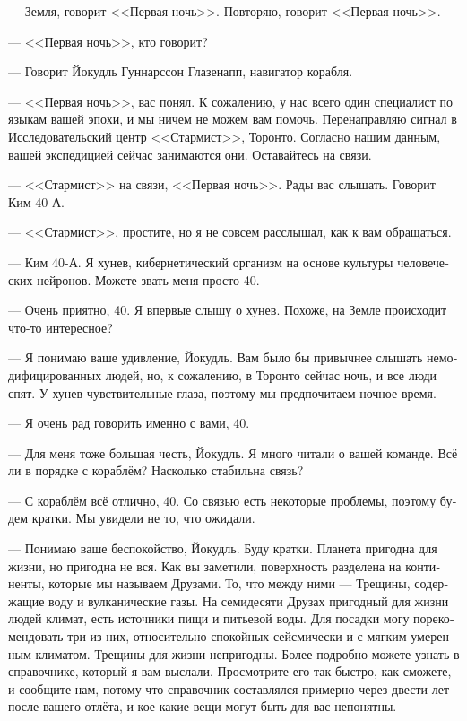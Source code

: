 \documentclass[a4paper,10pt,fleqn]{book}\usepackage{polyglossia}\setdefaultlanguage[babelshorthands=true]{russian}\setotherlanguage{english}\defaultfontfeatures{Ligatures=TeX,Mapping=tex-text}\usepackage{xcolor}\newcommand{\ml}[3]{#2}
\newcommand{\asterism}{\vspace{1em}{\centering\Large\bfseries$\ast~\ast~\ast$\par}\vspace{1em}}
\begin{document}
\asterism

--- Земля, говорит <<Первая ночь>>.
Повторяю, говорит <<Первая ночь>>.

--- <<Первая ночь>>, кто говорит?

--- Говорит Йокудль Гуннарссон Глазенапп, навигатор корабля.

--- <<Первая ночь>>, вас понял.
К сожалению, у нас всего один специалист по языкам вашей эпохи, и мы ничем не можем вам помочь.
Перенаправляю сигнал в Исследовательский центр <<Стармист>>, Торонто.
Согласно нашим данным, вашей экспедицией сейчас занимаются они.
Оставайтесь на связи.

--- <<Стармист>> на связи, <<Первая ночь>>.
Рады вас слышать.
Говорит Ким 40-А.

--- <<Стармист>>, простите, но я не совсем расслышал, как к вам обращаться.

--- Ким 40-А.
Я хунев, кибернетический организм на основе культуры человеческих нейронов.
Можете звать меня просто 40.

--- Очень приятно, 40.
Я впервые слышу о хунев.
Похоже, на Земле происходит что-то интересное?

--- Я понимаю ваше удивление, Йокудль.
Вам было бы привычнее слышать немодифицированных людей, но, к сожалению, в Торонто сейчас ночь, и все люди спят.
У хунев чувствительные глаза, поэтому мы предпочитаем ночное время.

--- Я очень рад говорить именно с вами, 40.

--- Для меня тоже большая честь, Йокудль.
Я много читали о вашей команде.
Всё ли в порядке с кораблём?
Насколько стабильна связь?

--- С кораблём всё отлично, 40.
Со связью есть некоторые проблемы, поэтому будем кратки.
Мы увидели не то, что ожидали.

--- Понимаю ваше беспокойство, Йокудль.
Буду кратки.
Планета пригодна для жизни, но пригодна не вся.
Как вы заметили, поверхность разделена на континенты, которые мы называем Друзами.
То, что между ними --- Трещины, содержащие воду и вулканические газы.
На семидесяти Друзах пригодный для жизни людей климат, есть источники пищи и питьевой воды.
Для посадки могу порекомендовать три из них, относительно спокойных сейсмически и с мягким умеренным климатом.
Трещины для жизни непригодны.
Более подробно можете узнать в справочнике, который я вам выслали.
Просмотрите его так быстро, как сможете, и сообщите нам, потому что справочник составлялся примерно через двести лет после вашего отлёта, и кое-какие вещи могут быть для вас непонятны.
\end{document}
